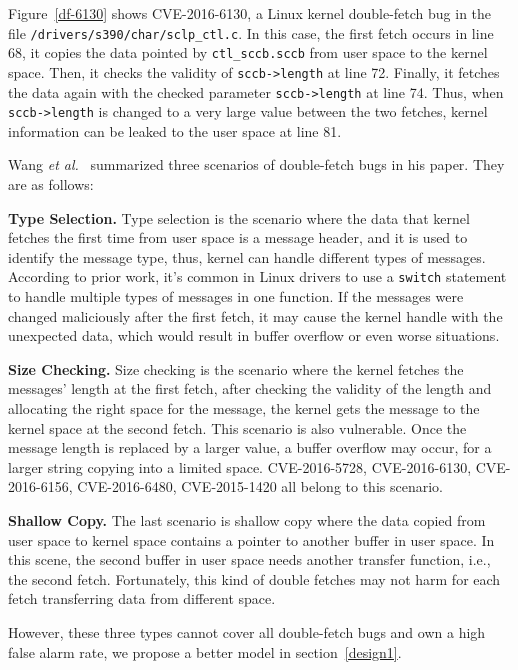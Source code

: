 \documentclass[10pt]{llncs}
\begin{document}
Figure~\ref{df-6130} shows CVE-2016-6130, a Linux kernel double-fetch bug in the file \verb:/drivers/s390/char/sclp_ctl.c:. In this case, the first fetch occurs in line 68, it copies the data pointed by \verb:ctl_sccb.sccb: from user space to the kernel space. Then, it checks the validity of \verb:sccb->length: at line 72. Finally, it fetches the data again with the checked parameter \verb:sccb->length: at line 74. Thus, when \verb:sccb->length: is changed to a very large value between the two fetches, kernel information can be leaked to the user space at line 81.

Wang \textit{et al.}~\cite{wang} summarized three scenarios of double-fetch bugs in his paper. They are as follows:

\textbf{Type Selection.}
Type selection is the scenario where the data that kernel fetches the first time from user space is a message header, and it is used to identify the message type, thus, kernel can handle different types of messages. According to prior work, it's common in Linux drivers to use a \verb:switch: statement to handle multiple types of messages in one function. If the messages were changed maliciously after the first fetch, it may cause the kernel handle with the unexpected data, which would result in buffer overflow or even worse situations.

\textbf{Size Checking.}
Size checking is the scenario where the kernel fetches the messages' length at the first fetch, after checking the validity of the length and allocating the right space for the message, the kernel gets the message to the kernel space at the second fetch. This scenario is also vulnerable. Once the message length is replaced by a larger value, a buffer overflow may occur, for a larger string copying into a limited space. CVE-2016-5728, CVE-2016-6130, CVE-2016-6156, CVE-2016-6480, CVE-2015-1420 all belong to this scenario.

\textbf{Shallow Copy.}
The last scenario is shallow copy where the data copied from user space to kernel space contains a pointer to another buffer in user space. In this scene, the second buffer in user space needs another transfer function, i.e., the second fetch. Fortunately, this kind of double fetches may not harm for each fetch transferring data from different space.

However, these three types cannot cover all double-fetch bugs and own a high false alarm rate, we propose a better model in section~\ref{design1}.
\end{document}
